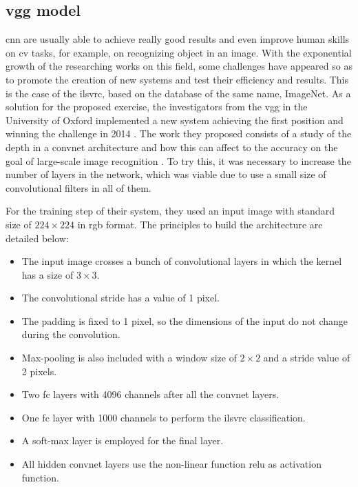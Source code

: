 	


\subsection{\acrfull{vgg} model}
\label{subsection:vgg}

	\acrshort{cnn} are usually able to achieve really good results and even improve human skills on \acrlong{cv} tasks, for example, on recognizing object in an image. With the exponential growth of the researching works on this field, some challenges have appeared so as to promote the creation of new systems and test their efficiency and results. This is the case of the \acrfull{ilsvrc}, based on the database of the same name, ImageNet. As a solution for the proposed exercise, the investigators from the \acrfull{vgg} in the University of Oxford implemented a new system achieving the first position and winning the challenge in 2014 \cite{ImageNet2014}. The work they proposed consists of a study of the depth in a \acrlong{convnet} architecture and how this can affect to the accuracy on the goal of large-scale image recognition \cite{Simonyan2015}. To try this, it was necessary to increase the number of layers in the network, which was viable due to use a small size of convolutional filters in all of them.

	For the training step of their system, they used an input image with standard size of $224 \times 224$ in \acrshort{rgb} format. The principles to build the architecture are detailed below:
	
	\begin{itemize}
		\item The input image crosses a bunch of convolutional layers in which the kernel has a size of $3 \times 3$.
		\item The convolutional stride has a value of 1 pixel.
		\item The padding is fixed to 1 pixel, so the dimensions of the input do not change during the convolution.
		\item Max-pooling is also included with a window size of $2 \times 2$ and a stride value of 2 pixels.
		\item Two \acrfull{fc} layers with 4096 channels after all the \acrlong{convnet} layers.
		\item One \acrshort{fc} layer with 1000 channels to perform the \acrshort{ilsvrc} classification.
		\item A soft-max layer is employed for the final layer.
		\item All hidden \acrlong{convnet} layers use the non-linear function \acrshort{relu} as activation function.
	\end{itemize}
	
